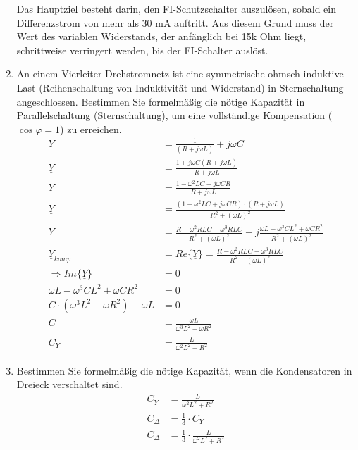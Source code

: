 \begin{enumerate}[label=\alph*)]
	Das Hauptziel besteht darin, den FI-Schutzschalter auszulösen, sobald ein Differenzstrom von mehr als 30 mA auftritt. Aus diesem Grund muss der Wert des variablen Widerstands, der anfänglich bei 15k Ohm liegt, schrittweise verringert werden, bis der FI-Schalter auslöst.

  \item An einem Vierleiter-Drehstromnetz ist eine symmetrische ohmsch-induktive Last (Reihenschaltung von Induktivität und Widerstand) in Sternschaltung angeschlossen. Bestimmen Sie formelmäßig die nötige Kapazität in Parallelschaltung (Sternschaltung), um eine vollständige Kompensation ($\cos \varphi = 1$) zu erreichen. \\
\begin{align*}
  \underline Y &=\frac{1}{(R+j\omega L)}+ {j\omega C}\\
  \underline Y &=\frac{1+ j\omega C(R+j\omega L)}{R+j\omega L}\\
  \underline Y &=\frac{1-\omega^2 LC+ j\omega CR}{R+j\omega L}\\
  \underline Y &=\frac{(1-\omega^2 LC+ j\omega CR) \cdot(R+j\omega L)}{R^2+(\omega L)^2}\\
  \underline Y &=\frac{R-\omega^2 RLC - \omega^3 RLC}{R^2+(\omega L)^2} 
  + j \frac{\omega L - \omega^3CL^2+\omega CR^2}{R^2+(\omega L)^2}\\
  \underline Y_{komp} &=Re\{\underline Y\}=\frac{R-\omega^2 RLC - \omega^3 RLC}{R^2+(\omega L)^2} \\
  \Rightarrow Im\{\underline Y\}&=0\\
  \omega L - \omega^3CL^2+\omega CR^2 &= 0\\
  C\cdot(\omega^3L^2+\omega R^2) - \omega L  &= 0\\
  C &=\frac{\omega L}{\omega^3 L^2+\omega R^2}\\
  C_{Y} &=\frac{L}{\omega^2 L^2+R^2}
\end{align*}

  \item Bestimmen Sie formelmäßig die nötige Kapazität, wenn die Kondensatoren in Dreieck verschaltet sind.
    \begin{align*}
      C_{Y} &=\frac{L}{\omega^2 L^2+R^2}\\
      C_{\Delta} &= \frac{1}{3}\cdot C_{Y}\\
      C_{\Delta} &= \frac{1}{3}\cdot \frac{L}{\omega^2 L^2+R^2}\\
    \end{align*}


\end{enumerate}
